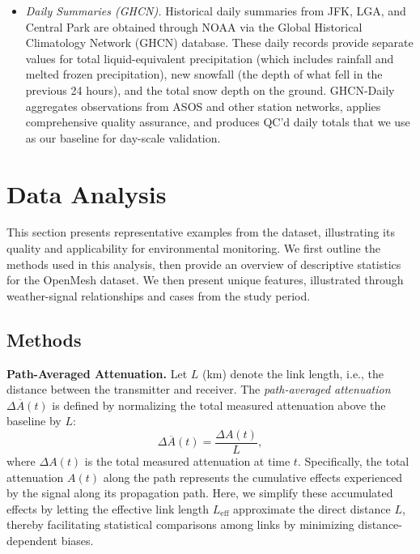\documentclass[manuscript]{copernicus}
\begin{document}
\begin{itemize}
\begin{itemize}
\item \emph{Daily Summaries (GHCN).}
Historical daily summaries from JFK, LGA, and Central Park are obtained through NOAA via the Global Historical Climatology Network (GHCN) database. 
These daily records provide separate values for total liquid-equivalent precipitation (which includes rainfall and melted frozen precipitation), new snowfall (the depth of what fell in the previous 24 hours), and the total snow depth on the ground.
GHCN-Daily aggregates observations from ASOS and other station networks, applies comprehensive quality assurance, and produces QC’d daily totals that we use as our baseline for day-scale validation.

\end{itemize}

\end{itemize}







\section{Data Analysis}\label{sec:data_analysis}
This section presents representative examples from the dataset, illustrating its quality and applicability for environmental monitoring. 
We first outline the methods used in this analysis, then provide an overview of descriptive statistics for the OpenMesh dataset. We then present unique features, illustrated through weather-signal relationships and cases from the study period.


\subsection{Methods}


\noindent \textbf{Path-Averaged Attenuation.}
Let \(L\) (km) denote the link length, i.e., the distance between the transmitter and receiver. The \emph{path-averaged attenuation} \(\Delta \overline{A}(t)\) is defined by normalizing the total measured attenuation above the baseline by \(L\):
\begin{equation}
\Delta \overline{A}(t) = \frac{\Delta A(t)}{L},
\end{equation}
where \(\Delta A(t)\) is the total measured attenuation at time \(t\). Specifically, the total attenuation \(A(t)\) along the path represents the cumulative effects experienced by the signal along its propagation path. Here, we simplify these accumulated effects by letting the effective link length \(L_\mathrm{eff}\) approximate the direct distance \(L\), thereby facilitating statistical comparisons among links by minimizing distance-dependent biases. 
\end{document}
